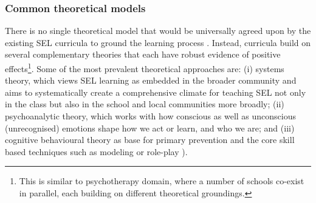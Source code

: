 \documentclass[prodmode,acmtochi]{acmsmall}
\newcommand{\qq}[2]{\textrm{\textit{``#2''}}{ [#1]}}
\begin{document}



\subsubsection{Common theoretical models}
There is no single theoretical model that would be universally agreed upon by the existing SEL curricula to ground the learning process \cite{Payton2000}. Instead, curricula build on several complementary theories that each have robust evidence of positive effects\footnote{This is similar to psychotherapy domain, where a number of schools co-exist in parallel, each building on different theoretical groundings.}. 
Some of the most prevalent theoretical approaches are: (i) systems theory, which views SEL learning as embedded in the broader community and aims to systematically create a comprehensive climate for teaching SEL not only in the class but also in the school and local communities more broadly; (ii) psychoanalytic theory, which works with how conscious as well as unconscious (unrecognised) emotions shape how we act or learn, and who we are; and (iii) cognitive behavioural theory as base for primary prevention and the core skill based techniques such as modeling or role-play \cite[p.65]{Maree2007}).
\end{document}
